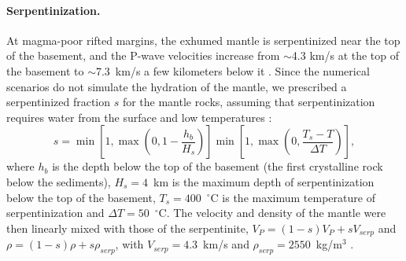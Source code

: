 \paragraph{Serpentinization.}
At magma-poor rifted margins, the exhumed mantle is serpentinized near the top of the
basement, and the P-wave velocities increase from $\sim$4.3 km/s at the top of the basement
to $\sim$7.3~km/s a few kilometers below it \citep{Minshull2009, Gillard2019}. Since the
numerical scenarios do not simulate the hydration of the mantle, we prescribed a serpentinized
fraction $s$ for the mantle rocks, assuming that serpentinization requires water from the
surface and low temperatures \citep{Martin1970, Reston2007}:
\begin{equation}
  s = \min\left[1, \max\left(0, 1 - \frac{h_b}{H_s}\right)\right]
      \min\left[1, \max\left(0, \frac{T_s - T}{\Delta T}\right)\right],
  \label{eq:serpentinization}
\end{equation}
where $h_b$ is the depth below the top of the basement (the first crystalline rock below the
sediments), $H_s = 4$~km is the maximum depth of serpentinization below the top of the
basement, $T_s = 400$~$^\circ$C is the maximum temperature of serpentinization and
$\Delta T = 50$~$^\circ$C. The velocity and density of the mantle were then linearly mixed with
those of the serpentinite, $V_P = (1 - s) V_P + s V_{serp}$ and
$\rho = (1 - s) \rho + s \rho_{serp}$, with $V_{serp} = 4.3$~km/s and
$\rho_{serp} = 2550$~kg/m$^3$ \citep{Christensen2004, Carlson2003}.


